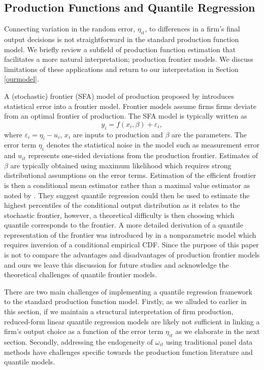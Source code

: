 \documentclass[11pt]{article}
\begin{document}
\subsection{Production Functions and Quantile Regression}


Connecting variation in the random error, $\eta_{it}$, to differences in a firm's final output decisions is not straightforward in the standard production function model. We briefly review a subfield of production function estimation that facilitates a more natural interpretation; production frontier models. We discuss limitations of these applications and return to our interpretation in Section \ref{ourmodel}.

A (stochastic) frontier (SFA) model of production proposed by \cite{Aigner1977} introduces statistical error into a frontier model. Frontier models assume firms firms deviate from an optimal frontier of production. The SFA model is typically written as
\begin{equation}
y_{i}=f(x_{i}, \beta)+\varepsilon_{i},
\end{equation}
where $\varepsilon_{i}=\eta_{i}-u_{i}$, $x_{i}$ are inputs to production and $\beta$ are the parameters. The error term $\eta_{i}$ denotes the statistical noise in the model such as measurement error and $u_{it}$ represents one-sided deviations from the production frontier. Estimates of $\beta$ are typically obtained using maximum likelihood which requires strong distributional assumptions on the error terms. Estimation of the efficient frontier is then a conditional mean estimator rather than a maximal value estimator as noted by \cite{Bernini2004}. They suggest quantile regression could then be used to estimate the highest percentiles of the conditional output distribution as it relates to the stochastic frontier, however, a theoretical difficulty is then choosing which quantile corresponds to the frontier. A more detailed derivation of a quantile representation of the frontier was introduced by \cite{Aragon2005} in a nonparametric model which requires inversion of a conditional empirical CDF. Since the purpose of this paper is not to compare the advantages and disadvantages of production frontier models and ours we leave this discussion for future studies and acknowledge the theoretical challenges of quantile frontier models. 

There are two main challenges of implementing a quantile regression framework to the standard production function model. Firstly, as we alluded to earlier in this section, if we maintain a structural interpretation of firm production, reduced-form linear quantile regression models are likely not sufficient in linking a firm's output choice as a function of the error term $\eta_{it}$ as we elaborate in the next section. Secondly, addressing the endogeneity of $\omega_{it}$ using traditional panel data methods have challenges specific towards the production function literature and quantile models.
\end{document}
